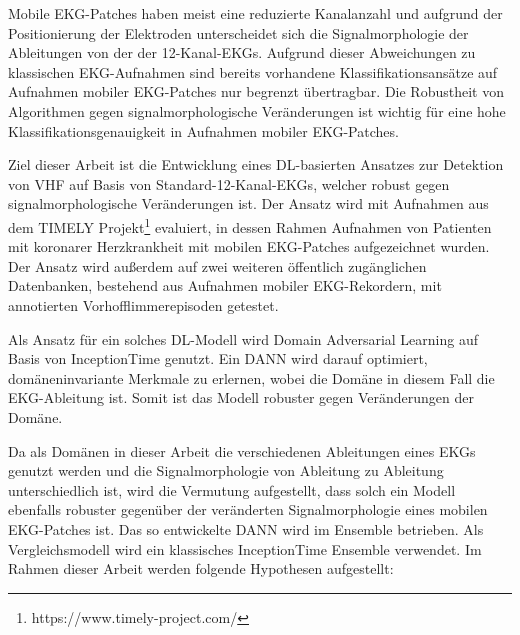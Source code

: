 
Mobile \gls{EKG}-Patches haben meist eine reduzierte Kanalanzahl und aufgrund der Positionierung der Elektroden unterscheidet sich die Signalmorphologie der Ableitungen von der der 12-Kanal-\gls{EKG}s. Aufgrund dieser Abweichungen zu klassischen \gls{EKG}-Aufnahmen sind bereits vorhandene Klassifikationsansätze auf Aufnahmen mobiler \gls{EKG}-Patches nur begrenzt übertragbar. Die Robustheit von Algorithmen gegen signalmorphologische Veränderungen ist wichtig für eine hohe Klassifikationsgenauigkeit in Aufnahmen mobiler \gls{EKG}-Patches. 

Ziel dieser Arbeit ist die Entwicklung eines \gls{DL}-basierten Ansatzes zur Detektion von \gls{VHF} auf Basis von Standard-12-Kanal-\gls{EKG}s, welcher robust gegen signalmorphologische Veränderungen ist. Der Ansatz wird mit Aufnahmen aus dem TIMELY Projekt\footnote{https://www.timely-project.com/} \cite{schmitz_patient-centered_2022} evaluiert, in dessen Rahmen Aufnahmen von Patienten mit koronarer Herzkrankheit mit mobilen \gls{EKG}-Patches aufgezeichnet wurden. Der Ansatz wird außerdem auf zwei weiteren öffentlich zugänglichen Datenbanken, bestehend aus Aufnahmen mobiler \gls{EKG}-Rekordern, mit annotierten Vorhofflimmerepisoden getestet.

Als Ansatz für ein solches \gls{DL}-Modell wird Domain Adversarial Learning auf Basis von InceptionTime \cite{fawaz_inceptiontime_2020} genutzt. Ein \gls{DANN} wird darauf optimiert, domäneninvariante Merkmale zu erlernen, wobei die Domäne in diesem Fall die \gls{EKG}-Ableitung ist. Somit ist das Modell robuster gegen Veränderungen der Domäne. \cite{ganin_domain-adversarial_2016}

Da als Domänen in dieser Arbeit die verschiedenen Ableitungen eines \gls{EKG}s genutzt werden und die Signalmorphologie von Ableitung zu Ableitung unterschiedlich ist, wird die Vermutung aufgestellt, dass solch ein Modell ebenfalls robuster gegenüber der veränderten Signalmorphologie eines mobilen \gls{EKG}-Patches ist. 
Das so entwickelte \gls{DANN} wird im Ensemble betrieben. Als Vergleichsmodell wird ein klassisches InceptionTime Ensemble verwendet. Im Rahmen dieser Arbeit werden folgende Hypothesen aufgestellt:

